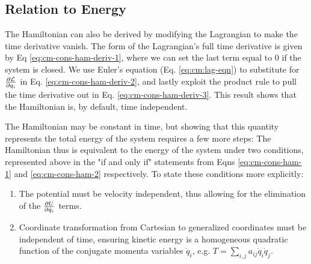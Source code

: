 \subsection{Relation to Energy}
The Hamiltonian can also be derived by modifying the Lagrangian to make the time derivative vanish. The form of the Lagrangian's full time derivative is given by Eq \ref{eq:cm-cons-ham-deriv-1}, where we can set the last term equal to 0 if the system is closed. We use Euler's equation (Eq. \ref{eq:cm:lag-eqn}) to substitute for $\frac{\partial \mathcal{L}}{\partial q_i}$ in Eq. \ref{eq:cm-cons-ham-deriv-2}, and lastly exploit the product rule to pull the time derivative out in Eq. \ref{eq:cm-cons-ham-deriv-3}. This result shows that the Hamiltonian is, by default, time independent.  



\newpage
The Hamiltonian may be constant in time, but showing that this quantity represents the total energy of the system requires a few more steps:
The Hamiltonian thus is equivalent to the energy of the system under two conditions, represented above in the "if and only if" statements from Eqns \ref{eq:cm-cons-ham-1} and \ref{eq:cm-cons-ham-2} respectively. To state these conditions more explicitly:

\begin{enumerate}
	\item The potential must be velocity independent, thus allowing for the elimination of the $\frac{\partial U}{\partial \dot{q}_i}$ terms.
	\item Coordinate transformation from Cartesian to generalized coordinates must be independent of time, ensuring kinetic energy is a homogeneous quadratic function of the conjugate momenta variables $\dot{q}_i$, e.g. $T = \sum_{i,j}a_{ij}\dot{q}_i\dot{q}_j$.
\end{enumerate}


